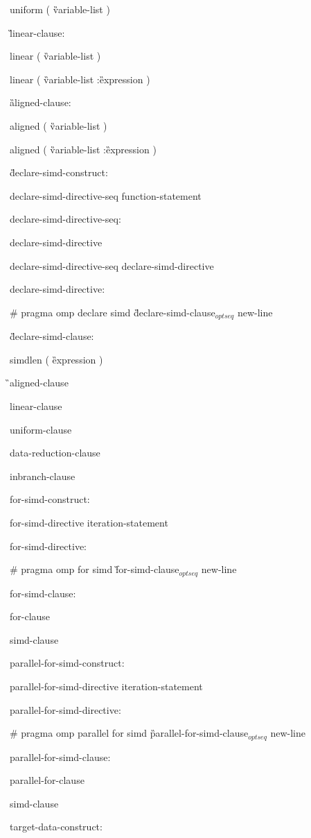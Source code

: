 {\C\I uniform ( \G variable-list \C )

\G linear-clause:

\C\I linear ( \G variable-list \C )

\C\I linear ( \G variable-list \C :\G expression \C )

\G aligned-clause:

\C\I aligned ( \G variable-list \C )

\I aligned ( \G variable-list \C :\G expression \C )

\G declare-simd-construct:

\I declare-simd-directive-seq function-statement

declare-simd-directive-seq:

\I declare-simd-directive

\I declare-simd-directive-seq declare-simd-directive

declare-simd-directive:

\C\I \# pragma omp declare simd \G declare-simd-clause$_{optseq}$ new-line

\G declare-simd-clause:

\C\I simdlen ( \G expression \C )

\G\I aligned-clause

\I linear-clause

\I uniform-clause

\I data-reduction-clause

\I inbranch-clause

for-simd-construct:

\I for-simd-directive iteration-statement

for-simd-directive:

\C\I \# pragma omp for simd \G for-simd-clause$_{optseq}$ new-line

for-simd-clause:

\I for-clause

\I simd-clause

parallel-for-simd-construct:

\I parallel-for-simd-directive iteration-statement

parallel-for-simd-directive:

\C\I \# pragma omp parallel for simd \G parallel-for-simd-clause$_{optseq}$ new-line

parallel-for-simd-clause:

\I parallel-for-clause

\I simd-clause

target-data-construct:

}
